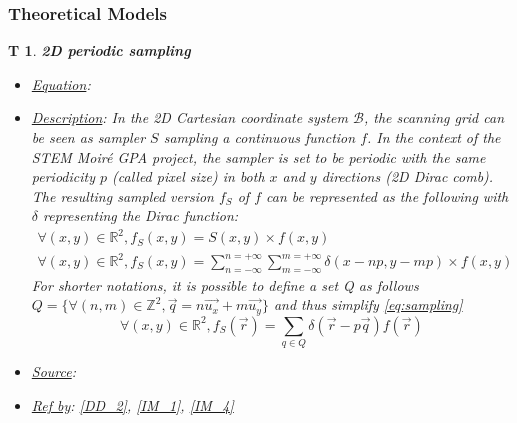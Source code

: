 \documentclass[12pt]{article}
\newcommand{\progname}{STEM Moir{\'e} GPA}
\newtheorem{T}{T}
\begin{document}
\subsubsection{Theoretical Models}\label{sec_theoretical}

\begin{T}
\label{T_1}
\noindent\colorbox{shadecolorT}{\normalfont \textbf{2D periodic sampling}}
\normalfont
\begin{itemize}
\item \underline{Equation}: 
\item \underline{Description}: In the 2D Cartesian coordinate system 
$\mathcal{B}$, the scanning grid can be seen as sampler $S$ sampling a 
continuous function $f$. In the context of the \progname{} project, the sampler 
is set to be periodic with the same periodicity $p$ (called pixel size) in both 
$x$ and $y$ directions (2D Dirac comb). The resulting sampled version $f_S$ of 
$f$ can be represented as the following with $\delta$ representing the Dirac 
function:
\begin{equation}
\begin{gathered}
\forall (x,y) \in \mathbb{R}^{2}, f_S(x,y)=S(x,y)\times f(x,y) \\
\forall (x,y) \in \mathbb{R}^{2}, 
f_S(x,y)=\sum_{n=-\infty}^{n=+\infty}\sum_{m=-\infty}^{m=+\infty}\delta(x-np,y-mp)\times 
f(x,y)
\end{gathered}
\label{eq:sampling}
\end{equation}
For shorter notations, it is possible to define a set Q as follows $Q=\{\forall 
(n,m) \in \mathbb{Z}^{2}, \vec{q}=n\vec{u_x}+m\vec{u_y}\}$ and thus simplify 
\cref{eq:sampling}
\begin{equation}
\forall (x,y) \in \mathbb{R}^{2}, f_S(\vec{r})=\sum_{q\in 
Q}\delta(\vec{r}-p\vec{q}) f(\vec{r})
\label{eq:sampling_simplified}
\end{equation}
\item \underline{Source}: \cite{Gonzalez_1992}
\item \underline{Ref by}: \cref{DD_2}, \cref{IM_1}, \cref{IM_4}
\end{itemize}
\end{T}
\end{document}
